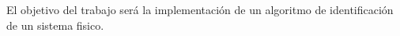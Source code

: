 El objetivo del trabajo será la implementación de un algoritmo de identificación de un sistema fisico.





